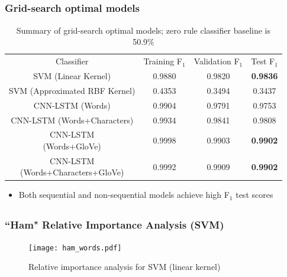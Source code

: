 \documentclass{beamer}
\begin{document}
\subsection{}
\begin{framefont}{\footnotesize}
	\begin{frame}
		\frametitle{Grid-search optimal models}
		\begin{table}
			\centering
			\bgroup
			\def\arraystretch{1.5}
			\begin{tabular}{|c|c|c|c|} \hline
				Classifier & Training F$_1$ & Validation F$_1$ & Test F$_1$  \\ \hhline{|=|=|=|=|}
				SVM (Linear Kernel) & 0.9880 & 0.9820 & \textbf{0.9836} \\ \hline
				SVM (Approximated RBF Kernel) & 0.4353 & 0.3494 & 0.3437 \\ \hline
				CNN-LSTM (Words) & 0.9904 & 0.9791 & 0.9753\\ \hline
				CNN-LSTM (Words+Characters) & 0.9934  & 0.9841 &  0.9808\\ \hline
				\makecell{CNN-LSTM \\(Words+GloVe)} & 0.9998  & 0.9903 & \textbf{0.9902} \\ \hline 
				\makecell{CNN-LSTM \\(Words+Characters+GloVe)} & 0.9992 & 0.9909 & \textbf{0.9902} \\ \hline
			\end{tabular}
			\egroup
			\caption{Summary of grid-search optimal models; zero rule classifier baseline is 50.9\%}
		\end{table}
		\begin{itemize}
			\item Both sequential and non-sequential models achieve high F$_1$ test scores
		\end{itemize}
	\end{frame}
\end{framefont}

\subsection{}
\begin{framefont}{\footnotesize}
	\begin{frame}
		\frametitle{``Ham" Relative Importance Analysis (SVM)}
		\centering
		\begin{figure}
			\captionsetup{justification=centering}
			\texttt{[image: ham\_words.pdf]}
			\caption{Relative importance analysis for SVM (linear kernel)}
		\end{figure}
	\end{frame}
\end{framefont}
\end{document}
